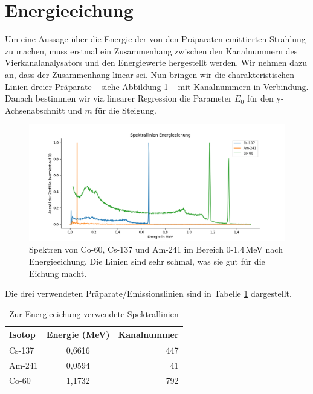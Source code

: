 \section{Energieeichung}
\label{section:Energieeichung}

Um eine Aussage über die Energie der von den Präparaten emittierten Strahlung zu machen, muss erstmal ein Zusammenhang zwischen 
den Kanalnummern des Vierkanalanalysators und den Energiewerte hergestellt werden. Wir nehmen dazu an, dass der Zusammenhang linear sei. Nun bringen wir 
die charakteristischen Linien dreier Präparate – siehe Abbildung \ref{bild:EichungDrei} – mit Kanalnummern in Verbindung. Danach bestimmen 
wir via linearer Regression die Parameter $E_0$  für den y-Achsenabschnitt und $m$ für die Steigung.\\

\begin{figure}[h]
    \centering
    \captionsetup{justification=centering,margin=1cm}
    \includegraphics[width = \linewidth]{Bilder/Auswertung/EnergieeichungLinien.png}
    \caption{Spektren von Co-60, Cs-137 und Am-241 im Bereich 0-1,4\,MeV nach Energieeichung. Die Linien sind sehr schmal, was sie gut für die Eichung macht.}
    \label{bild:EichungDrei}
\end{figure}




Die drei verwendeten Präparate/Emissionslinien  sind in Tabelle \ref{Eichung} dargestellt.
 \begin{table}[h]
    \centering
     \begin{tabular}{lcr}
        Isotop & Energie (MeV) & Kanalnummer \\
        \toprule
         Cs-137 & 0,6616  & 447\\
         Am-241 & 0,0594 & 41\\
         Co-60 & 1,1732 & 792\\
     \end{tabular}
     \caption{Zur Energieeichung verwendete Spektrallinien}
     \label{Eichung}
 \end{table}

